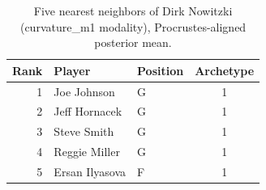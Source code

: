 \begin{table}[htbp]
  \centering\small
  \begin{tabular}{rllc}
    \toprule
    Rank & Player & Position & Archetype \\
    \midrule
    1 & Joe Johnson & G & 1 \\
    2 & Jeff Hornacek & G & 1 \\
    3 & Steve Smith & G & 1 \\
    4 & Reggie Miller & G & 1 \\
    5 & Ersan Ilyasova & F & 1 \\
    \bottomrule
  \end{tabular}
  \caption{Five nearest neighbors of Dirk Nowitzki (curvature_m1 modality), Procrustes-aligned posterior mean.}
  \label{tab:Dirk_Nowitzki_neighbors_curvature_m1}
\end{table}

